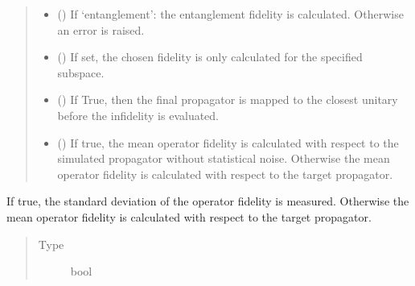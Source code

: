 \documentclass[letterpaper,10pt,english]{sphinxmanual}
\begin{document}
\begin{fulllineitems}
\begin{quote}
\begin{description}
\begin{itemize}
\item {} 
 (\sphinxstyleliteralemphasis{\sphinxupquote{, }}) \textendash{} If ‘entanglement’: the entanglement fidelity is calculated.
Otherwise an error is raised.

\item {} 
 (\sphinxstyleliteralemphasis{\sphinxupquote{, }}) \textendash{} If set, the chosen fidelity is only calculated for the specified
subspace.

\item {} 
 (\sphinxstyleliteralemphasis{\sphinxupquote{, }}) \textendash{} If True, then the final propagator is mapped to the closest unitary
before the infidelity is evaluated.

\item {} 
 () \textendash{} If true, the mean operator fidelity is calculated with respect to the
simulated propagator without statistical noise.
Otherwise the mean operator fidelity is calculated with respect to the
target propagator.

\end{itemize}

\end{description}\end{quote}

\begin{fulllineitems}
\label{\detokenize{qsim:qsim.cost_functions.OperationNoiseInfidelity.neglect_systematic_errors}}
If true, the standard deviation of the operator fidelity is measured.
Otherwise the mean operator fidelity is calculated with respect to the
target propagator.
\begin{quote}\begin{description}
\item[{Type}] \leavevmode
bool


\end{description}
\end{quote}
\end{fulllineitems}
\end{fulllineitems}
\end{document}
